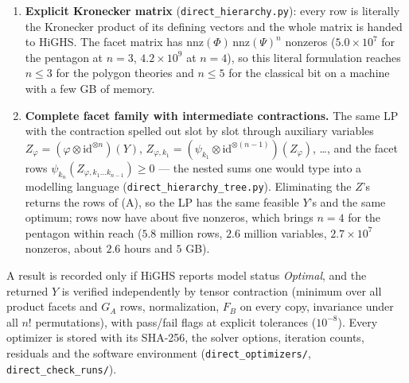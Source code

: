 \documentclass[11pt,a4paper]{article}
\newcommand*{\code}[1]{\texttt{#1}}
\theoremstyle{remark}
\begin{document}
\begin{enumerate}[leftmargin=2em,label=(\Alph*)]
\item \textbf{Explicit Kronecker matrix} (\code{direct\_hierarchy.py}):
every row is literally the Kronecker product of its defining vectors and
the whole matrix is handed to HiGHS. The facet matrix has
$\mathrm{nnz}(\Phi)\,\mathrm{nnz}(\Psi)^n$ nonzeros ($5.0\times10^7$ for
the pentagon at $n=3$, $4.2\times10^9$ at $n=4$), so this literal
formulation reaches $n\leq 3$ for the polygon theories and $n\leq 5$ for
the classical bit on a machine with a few GB of memory.
\item \textbf{Complete facet family with intermediate contractions.}
The same LP with the contraction spelled out slot by slot through
auxiliary variables
$Z_\varphi=(\varphi\otimes\mathrm{id}^{\otimes n})(Y)$,
$Z_{\varphi,k_1}=(\psi_{k_1}\otimes\mathrm{id}^{\otimes(n-1)})(Z_\varphi)$,
\ldots, and the facet rows $\psi_{k_n}(Z_{\varphi,k_1\ldots k_{n-1}})\geq 0$
--- the nested sums one would type into a modelling language
(\code{direct\_hierarchy\_tree.py}). Eliminating the $Z$'s returns the rows
of (A), so the LP has the same feasible $Y$'s and the same optimum; rows now have about five nonzeros, which brings
$n=4$ for the pentagon within reach ($5.8$ million rows, $2.6$ million
variables, $2.7\times 10^7$ nonzeros, about $2.6$ hours and $5$ GB).
\end{enumerate}
A result is recorded only if HiGHS reports model status \emph{Optimal}, and
the returned $Y$ is verified independently by tensor contraction (minimum
over all product facets and $G_A$ rows, normalization, $F_B$ on every copy,
invariance under all $n!$ permutations), with pass/fail flags at explicit
tolerances ($10^{-8}$). Every optimizer is stored with its SHA-256, the
solver options, iteration counts, residuals and the software environment
(\code{direct\_optimizers/}, \code{direct\_check\_runs/}).
\end{document}
